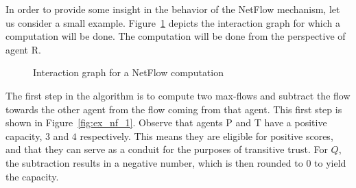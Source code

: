 \documentclass[a4paper,11pt]{book}
\theoremstyle{definition}
\begin{document}
In order to provide some insight in the behavior of the NetFlow mechanism, let us consider a
small example. Figure~\ref{fig:ex_ig_for_nf} depicts the interaction graph for which a computation
will be done. The computation will be done from the perspective of agent R.

\begin{figure}[h]
    \centering
     \caption{Interaction graph for a NetFlow computation}
     \label{fig:ex_ig_for_nf}
\end{figure}

The first step in the algorithm is to compute two max-flows and subtract the flow towards
the other agent from the flow coming from that agent. This first step is shown in Figure~\ref{fig:ex_nf_1}.
Observe that agents P and T have a positive capacity, $3$ and $4$ respectively. 
This means they are eligible for positive
scores, and that they can serve as a conduit for the purposes of transitive trust. For $Q$, the
subtraction results in a negative number, which is then rounded to $0$ to yield the capacity.
\end{document}
